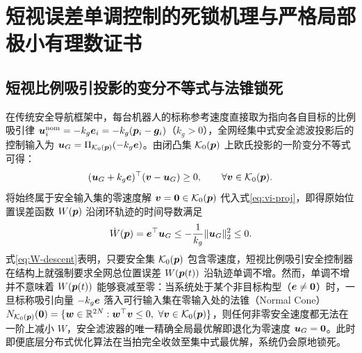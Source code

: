 \section{短视误差单调控制的死锁机理与严格局部极小有理数证书}\label{sec:obstruction}

\subsection{短视比例吸引投影的变分不等式与法锥锁死}
在传统安全导航框架中\cite{ames2017cbf,reis2021}，每台机器人的标称参考速度直接取为指向各自目标的比例吸引律 $\boldsymbol{u}_i^{\mathrm{nom}}=-k_g\boldsymbol{e}_i=-k_g(\boldsymbol{p}_i-\boldsymbol{g}_i)$（$k_g>0$），全网经集中式安全滤波投影后的控制输入为 $\boldsymbol{u}_G=\Pi_{\mathcal K_0(\boldsymbol{p})}(-k_g\boldsymbol{e})$。由闭凸集 $\mathcal K_0(\boldsymbol{p})$ 上欧氏投影的一阶变分不等式可得：
\begin{equation}
 (\boldsymbol{u}_G+k_g\boldsymbol{e})^{\top}(\boldsymbol v-\boldsymbol{u}_G)\ge 0,\qquad\forall\boldsymbol v\in\mathcal K_0(\boldsymbol{p}).
 \label{eq:vi-proj}
\end{equation}
将始终属于安全输入集的零速度解 $\boldsymbol v=\boldsymbol 0\in\mathcal K_0(\boldsymbol{p})$ 代入式\eqref{eq:vi-proj}，即得原始位置误差函数 $W(\boldsymbol{p})$ 沿闭环轨迹的时间导数满足
\begin{equation}
 \dot W(\boldsymbol{p})=\boldsymbol{e}^{\top}\boldsymbol{u}_G\le -\frac{1}{k_g}\lVert\boldsymbol{u}_G\rVert_2^2\le 0.
 \label{eq:W-descent}
\end{equation}
式\eqref{eq:W-descent}表明，只要安全集 $\mathcal K_0(\boldsymbol{p})$ 包含零速度，短视比例吸引安全控制器在结构上就强制要求全网总位置误差 $W(\boldsymbol{p}(t))$ 沿轨迹单调不增。然而，单调不增并不意味着 $W(\boldsymbol{p}(t))$ 能够衰减至零：当系统处于某个非目标构型（$\boldsymbol{e}\ne\boldsymbol 0$）时，一旦标称吸引向量 $-k_g\boldsymbol{e}$ 落入可行输入集在零输入处的法锥（Normal Cone）$N_{\mathcal K_0(\bp)}(\boldsymbol 0)=\{\boldsymbol w\in\mathbb R^{2N}:\boldsymbol w^{\top}\boldsymbol v\le 0,\ \forall\boldsymbol v\in\mathcal K_0(\bp)\}$\cite{rockafellar1970}，则任何非零安全速度都无法在一阶上减小 $W$，安全滤波器的唯一精确全局最优解即退化为零速度 $\boldsymbol{u}_G=\boldsymbol 0$。此时即便底层分布式优化算法在当拍完全收敛至集中式最优解，系统仍会原地锁死。


